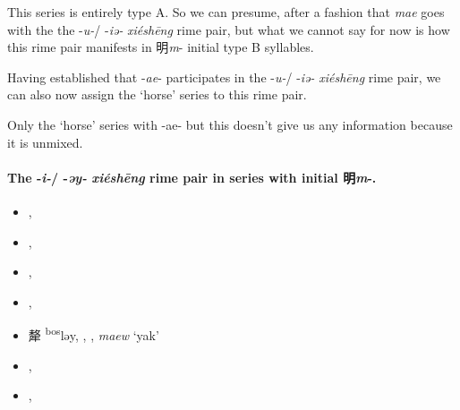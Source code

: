 This series is entirely type A. So we can presume, after a fashion that \textit{mae} goes with the the -\textit{u-}/ -\textit{iə-} \textit{xiéshēng} rime pair, but what we cannot say for now is how this rime pair manifests in 明\textit{m}- initial
type B syllables. 

Having established that -\textit{ae}- participates in the -\textit{u-}/ -\textit{iə-} \textit{xiéshēng} rime pair, we can also now assign the `horse' series to this rime pair. 

Only the `horse' series with -ae- but this doesn't give us any information because it is unmixed. 


\paragraph{The -\textit{i-}/ -\textit{əy-} \textit{xiéshēng} rime pair in series with initial 明\textit{m}-.}

\begin{itemize}
    \item {} %
    {},
    {}            %

    \item {} %
    {},
    {}            %

    \item {} %
    {},
    {}            %

    \item {} %
    {},
    {}            %

    \item {\Large{犛}} %
    {\large{{\textsuperscript{bos}}ləy}},
    {}, {}, 
    \textit{maew} `yak'     %

   
    \item {} %
    {},
    {}            %

\item {} %
{},
{}           %
\end{itemize}

